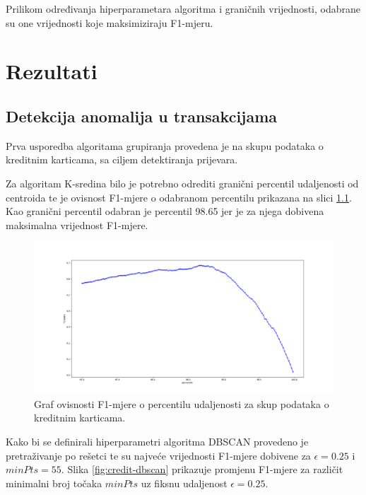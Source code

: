 \documentclass[utf8, diplomski, numeric]{fer}
\begin{document}
Prilikom određivanja hiperparametara algoritma i graničnih vrijednosti, odabrane su one vrijednosti koje maksimiziraju F1-mjeru.

\chapter{Rezultati}

\section{Detekcija anomalija u transakcijama}
Prva usporedba algoritama grupiranja provedena je na skupu podataka o kreditnim karticama, sa ciljem detektiranja prijevara.

Za algoritam K-sredina bilo je potrebno odrediti granični percentil udaljenosti od centroida te je ovisnost F1-mjere o odabranom percentilu prikazana na slici \ref{fig:credit-kmeans}. Kao granični percentil odabran je percentil 98.65 jer je za njega dobivena maksimalna vrijednost F1-mjere.

\begin{figure}[htb]
\includegraphics[width=1\textwidth]{images/credit-kmeans-f1.png}
\centering
\caption{Graf ovisnosti F1-mjere o percentilu udaljenosti za skup podataka o kreditnim karticama.}
\label{fig:credit-kmeans}
\end{figure}

Kako bi se definirali hiperparametri algoritma DBSCAN provedeno je pretraživanje po rešetci te su najveće vrijednosti F1-mjere dobivene za $\epsilon = 0.25$ i $minPts = 55$. Slika \ref{fig:credit-dbscan} prikazuje promjenu F1-mjere za različit minimalni broj točaka $minPts$ uz fiksnu udaljenost $\epsilon = 0.25$.
\end{document}
